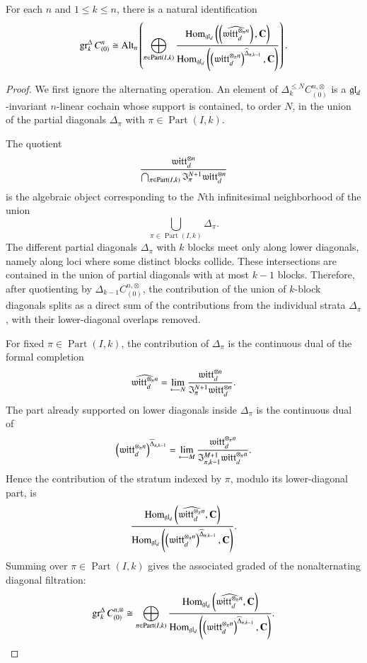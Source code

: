 \documentclass[main.tex]{subfiles}
\begin{document}
\begin{lemma}\label{lem:diag}
For each $n$ and $1\leq k\leq n$, there is a natural identification
\[
  \operatorname{gr}^\Delta_k C^n_{(0)}
  \cong
  \operatorname{Alt}_n
  \left(
  \bigoplus_{\pi\in \operatorname{Part}(I,k)}
  \frac{
  \operatorname{Hom}_{\mathfrak{gl}_d}
  \left(
    \left(\widehat{\mathfrak{witt}_d^{\otimes_\pi n}}\right),
  \mathbf{C}
  \right)}
  {
  \operatorname{Hom}_{\mathfrak{gl}_d}
  \left(
  \left(\mathfrak{witt}_d^{\otimes_\pi n}\right)^{\widehat\Delta_{\pi,k-1}},
  \mathbf{C}
  \right)}
  \right).
\]
\end{lemma}
\begin{proof}
We first ignore the alternating operation. 
An element of $\Delta_k^{\leq N} C_{(0)}^{n,\otimes}$ is a $\mathfrak{gl}_d$-invariant $n$-linear cochain whose support is contained, to order $N$, in the union of the partial diagonals $\Delta_\pi$ with $\pi\in \operatorname{Part}(I,k)$.

The quotient
\[
  \frac{\mathfrak{witt}_d^{\otimes n}}
  {\bigcap_{\pi\in \operatorname{Part}(I,k)}
  \mathfrak I_\pi^{N+1}\mathfrak{witt}_d^{\otimes n}}
\]
is the algebraic object corresponding to the $N$th infinitesimal neighborhood of the union
\[
  \bigcup_{\pi\in \operatorname{Part}(I,k)}\Delta_\pi .
\]
The different partial diagonals $\Delta_\pi$ with $k$ blocks meet only along lower diagonals, namely along loci where some distinct blocks collide. These intersections are contained in the union of partial diagonals with at most $k-1$ blocks. Therefore, after quotienting by $\Delta_{k-1}C_{(0)}^{n,\otimes}$, the contribution of the union of $k$-block diagonals splits as a direct sum of the contributions from the individual strata $\Delta_\pi$, with their lower-diagonal overlaps removed.

For fixed $\pi\in \operatorname{Part}(I,k)$, the contribution of $\Delta_\pi$ is the continuous dual of the formal completion
\[
  \widehat{\mathfrak{witt}_d^{\otimes_\pi n}}
  =
  \lim_{\longleftarrow N}
  \frac{\mathfrak{witt}_d^{\otimes n}}
  {\mathfrak I_\pi^{N+1}\mathfrak{witt}_d^{\otimes n}}.
\]
The part already supported on lower diagonals inside $\Delta_\pi$ is the continuous dual of
\[
  \left(
  \mathfrak{witt}_d^{\otimes_\pi n}
  \right)^{\widehat\Delta_{\pi,k-1}}
  =
  \lim_{\longleftarrow M}
  \frac{\mathfrak{witt}_d^{\otimes_\pi n}}
  {\mathfrak I_{\pi,k-1}^{M+1}\mathfrak{witt}_d^{\otimes_\pi n}}.
\]
Hence the contribution of the stratum indexed by $\pi$, modulo its lower-diagonal part, is
\[
  \frac{
  \operatorname{Hom}_{\mathfrak{gl}_d}
  \left(
  \widehat{\mathfrak{witt}_d^{\otimes_\pi n}},
  \mathbf{C}
  \right)}
  {
  \operatorname{Hom}_{\mathfrak{gl}_d}
  \left(
  \left(
  \mathfrak{witt}_d^{\otimes_\pi n}
  \right)^{\widehat\Delta_{\pi,k-1}},
  \mathbf{C}
  \right)}.
\]
Summing over $\pi\in \operatorname{Part}(I,k)$ gives the associated graded of the nonalternating diagonal filtration:
\[
  \operatorname{gr}^\Delta_k C_{(0)}^{n,\otimes}
  \cong
  \bigoplus_{\pi\in \operatorname{Part}(I,k)}
  \frac{
  \operatorname{Hom}_{\mathfrak{gl}_d}
  \left(
  \widehat{\mathfrak{witt}_d^{\otimes_\pi n}},
  \mathbf{C}
  \right)}
  {
  \operatorname{Hom}_{\mathfrak{gl}_d}
  \left(
  \left(
  \mathfrak{witt}_d^{\otimes_\pi n}
  \right)^{\widehat\Delta_{\pi,k-1}},
  \mathbf{C}
  \right)}.
\]


\end{proof}
\end{document}
